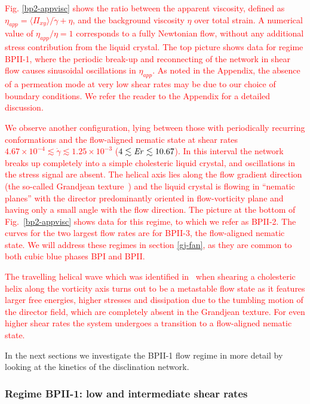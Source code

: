 \documentclass[8.5pt,twoside,twocolumn]{article}
\newcommand{\e}[1]{\times10^{#1}}
\newcommand{\gd}{\dot{\gamma}}
\newcommand{\rev}[1]{{\textcolor{red}{#1}}}
\begin{document}
\rev{
Fig. \ref{bp2-appvisc} shows the ratio between the apparent viscosity, 
defined as $\eta_{app}=\langle \Pi_{xy} \rangle/\gd +\eta$, and the background viscosity $\eta$ 
over total strain.
A numerical value of $\eta_{app}/\eta=1$ corresponds to a fully Newtonian flow,
without any additional stress contribution from the liquid crystal.
The top picture shows data for regime BPII-1, where the periodic break-up and reconnecting of the network 
in shear flow causes sinusoidal oscillations in $\eta_{app}$. As noted in the Appendix, the
absence of a permeation mode at very low shear rates may be due to our
choice of boundary conditions. We refer the reader to the Appendix for a detailed discussion.
}

\rev{
We observe another configuration, lying between those with periodically recurring conformations 
and the flow-aligned nematic state at shear rates $4.67\e{-4}\lesssim\gd\lesssim1.25\e{-3}$ ($4 \lesssim {\it Er} \lesssim 10.67$). 
In this interval the network breaks up completely into a simple cholesteric liquid crystal, and oscillations in the stress signal are absent.
The helical axis lies along the flow gradient direction (the so-called Grandjean texture~\cite{deGennes})
and the liquid crystal is flowing in ``nematic planes'' with the director predominantly oriented in flow-vorticity plane and having only
a small angle with the flow direction.
The picture at the bottom of Fig.~\ref{bp2-appvisc} shows data for this regime, to which we refer as BPII-2. The 
curves for the two largest flow rates are for BPII-3, the flow-aligned nematic state. 
We will address these regimes in section \ref{gj-fan}, as they are common to both cubic blue phases BPI and BPII.
}

\rev{
The travelling helical wave which was identified in~\cite{Rey:1996a,Rey:1996b} when shearing a cholesteric helix along
the vorticity axis turns out to be a metastable flow state as it features larger free energies, higher stresses and dissipation due 
to the tumbling motion of the director field, which are completely absent in the Grandjean texture.
For even higher shear rates the system undergoes a transition to a flow-aligned nematic state.
}

In the next sections we investigate the BPII-1 flow regime in more detail 
by looking at the kinetics of the disclination network.


\subsubsection{Regime BPII-1: low and intermediate shear rates }
\end{document}

